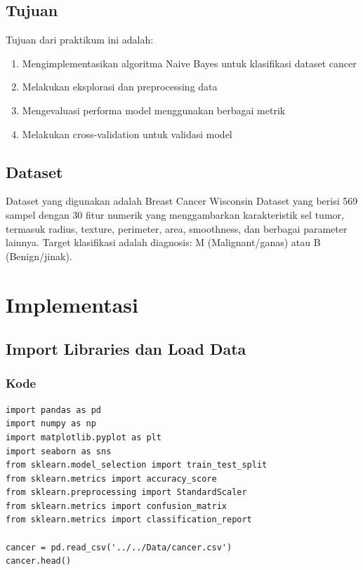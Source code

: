 \documentclass[12pt,a4paper]{article}
\begin{document}
\subsection{Tujuan}
Tujuan dari praktikum ini adalah:
\begin{enumerate}
    \item Mengimplementasikan algoritma Naive Bayes untuk klasifikasi dataset cancer
    \item Melakukan eksplorasi dan preprocessing data
    \item Mengevaluasi performa model menggunakan berbagai metrik
    \item Melakukan cross-validation untuk validasi model
\end{enumerate}

\subsection{Dataset}
Dataset yang digunakan adalah Breast Cancer Wisconsin Dataset yang berisi 569 sampel dengan 30 fitur numerik yang menggambarkan karakteristik sel tumor, termasuk radius, texture, perimeter, area, smoothness, dan berbagai parameter lainnya. Target klasifikasi adalah diagnosis: M (Malignant/ganas) atau B (Benign/jinak).

\newpage
\section{Implementasi}

\subsection{Import Libraries dan Load Data}

\subsubsection{Kode}
\begin{lstlisting}[style=pythonstyle]
import pandas as pd
import numpy as np
import matplotlib.pyplot as plt
import seaborn as sns
from sklearn.model_selection import train_test_split
from sklearn.metrics import accuracy_score
from sklearn.preprocessing import StandardScaler
from sklearn.metrics import confusion_matrix
from sklearn.metrics import classification_report

cancer = pd.read_csv('../../Data/cancer.csv')
cancer.head()
\end{lstlisting}
\end{document}

